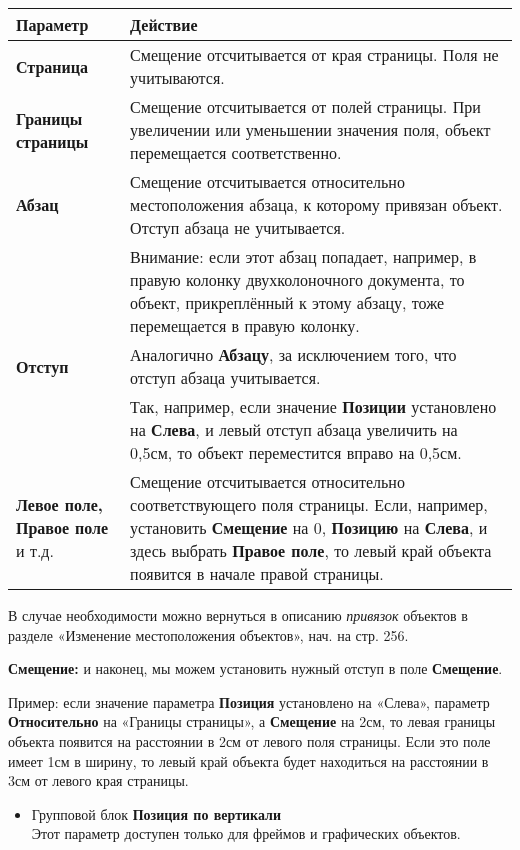 ﻿\documentclass[a4paper,10pt]{article}
\begin{document}
\begin{center}
\begin{tabular}{  m{4cm}  m{12cm}  }
 \textbf{Параметр} & \textbf{Действие}\\ 
 \hline
  \textbf{Страница} & Смещение отсчитывается от края страницы. Поля не учитываются.\\
  \textbf{Границы страницы} & Смещение отсчитывается от полей страницы. При увеличении или уменьшении значения поля, объект перемещается соответственно.\\ 
\textbf{Абзац} & Смещение отсчитывается относительно местоположения абзаца, к которому привязан объект. Отступ абзаца не учитывается.\\
\textbf{} & Внимание: если этот абзац попадает, например, в правую колонку двухколоночного документа, то объект, прикреплённый к этому абзацу, тоже перемещается в правую колонку.\\
\textbf{Отступ} & Аналогично \textbf{Абзацу}, за исключением того, что отступ абзаца учитывается.\\
\textbf{} & Так, например, если значение \textbf{Позиции} установлено на \textbf{Слева}, и левый отступ абзаца увеличить на 0,5см, то объект переместится вправо на 0,5см.\\
\textbf{Левое поле, Правое поле} и т.д. & Смещение отсчитывается относительно соответствующего поля страницы. Если, например, установить \textbf{Смещение} на 0, \textbf{Позицию} на \textbf{Слева}, и здесь выбрать \textbf{Правое поле}, то левый край объекта появится в начале правой страницы.
\end{tabular}
\end{center}

В случае необходимости можно вернуться в описанию \textit{привязок} объектов в разделе «Изменение местоположения объектов», нач. на стр. 256.

\textbf{Смещение:} и наконец, мы можем установить нужный отступ в поле \textbf{Смещение}.

Пример: если значение параметра \textbf{Позиция} установлено на «Слева», параметр \textbf{Относительно} на «Границы страницы», а \textbf{Смещение} на 2см, то левая границы объекта появится на расстоянии в 2см от левого поля страницы. Если это поле имеет 1см в ширину, то левый край объекта будет находиться на расстоянии в 3см от левого края страницы.

\begin{itemize}
 \item Групповой блок \textbf{Позиция по вертикали}\\
 Этот параметр доступен только для фреймов и графических объектов.
 \end{itemize}
 
\end{document}

